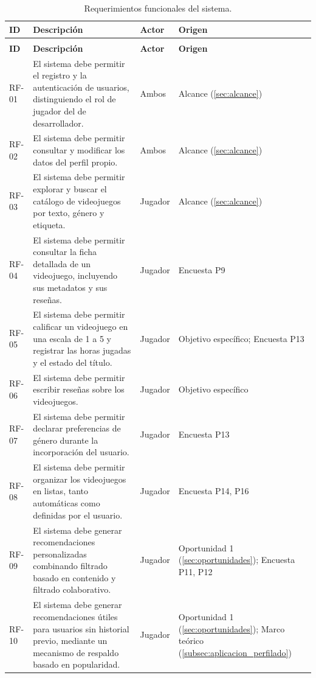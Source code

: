 \begin{longtable}{|>{\raggedright\arraybackslash}p{1.1cm}|>{\raggedright\arraybackslash}p{7.4cm}|>{\raggedright\arraybackslash}p{1.6cm}|>{\raggedright\arraybackslash}p{2.9cm}|}
	\caption{Requerimientos funcionales del sistema.}\label{tab:rf} \\
	\hline
	\textbf{ID} & \textbf{Descripción} & \textbf{Actor} & \textbf{Origen} \\
	\hline
	\endfirsthead
	\multicolumn{4}{l}{\textit{Continuación de la Tabla \ref{tab:rf}}} \\
	\hline
	\textbf{ID} & \textbf{Descripción} & \textbf{Actor} & \textbf{Origen} \\
	\hline
	\endhead
	\hline
	\endfoot
	\hline
	\endlastfoot
	RF-01 & El sistema debe permitir el registro y la autenticación de usuarios, distinguiendo el rol de jugador del de desarrollador. & Ambos & Alcance (\ref{sec:alcance}) \\
	RF-02 & El sistema debe permitir consultar y modificar los datos del perfil propio. & Ambos & Alcance (\ref{sec:alcance}) \\
	RF-03 & El sistema debe permitir explorar y buscar el catálogo de videojuegos por texto, género y etiqueta. & Jugador & Alcance (\ref{sec:alcance}) \\
	RF-04 & El sistema debe permitir consultar la ficha detallada de un videojuego, incluyendo sus metadatos y sus reseñas. & Jugador & Encuesta P9 \\
	RF-05 & El sistema debe permitir calificar un videojuego en una escala de 1 a 5 y registrar las horas jugadas y el estado del título. & Jugador & Objetivo específico; Encuesta P13 \\
	RF-06 & El sistema debe permitir escribir reseñas sobre los videojuegos. & Jugador & Objetivo específico \\
	RF-07 & El sistema debe permitir declarar preferencias de género durante la incorporación del usuario. & Jugador & Encuesta P13 \\
	RF-08 & El sistema debe permitir organizar los videojuegos en listas, tanto automáticas como definidas por el usuario. & Jugador & Encuesta P14, P16 \\
	RF-09 & El sistema debe generar recomendaciones personalizadas combinando filtrado basado en contenido y filtrado colaborativo. & Jugador & Oportunidad 1 (\ref{sec:oportunidades}); Encuesta P11, P12 \\
	RF-10 & El sistema debe generar recomendaciones útiles para usuarios sin historial previo, mediante un mecanismo de respaldo basado en popularidad. & Jugador & Oportunidad 1 (\ref{sec:oportunidades}); Marco teórico (\ref{subsec:aplicacion_perfilado}) \\

\end{longtable}
